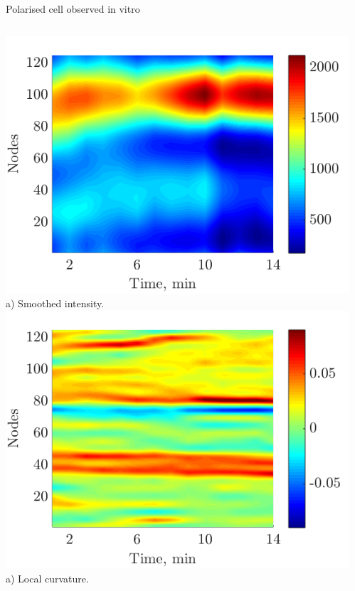 \documentclass[mathserif,11pt]{beamer}
\begin{document}
\begin{frame}{Polarised cell observed in vitro}
\begin{columns}
	\begin{column}{0.5\textwidth}
	\centering
	\includegraphics[scale=0.3]{Figures/polarised_smoothed_akt.png}\vfil
	\footnotesize{a) Smoothed intensity.}
	\vfil
	\includegraphics[scale=0.3]{Figures/polarised_curvature.png}\vfil	
	\footnotesize{a) Local curvature.}
\end{column}
\begin{column}{0.5\textwidth}
	\centering

\end{column}
\end{columns}
\end{frame}
\end{document}
